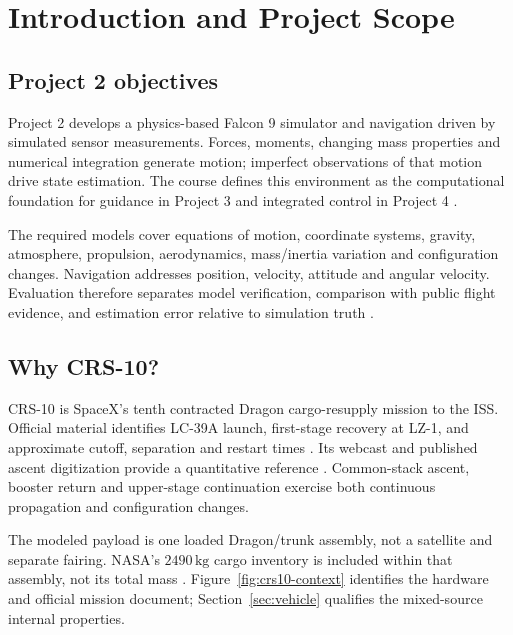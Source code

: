 \section{Introduction and Project Scope}
\label{sec:introduction}

\subsection{Project 2 objectives}
Project 2 develops a physics-based Falcon 9 simulator and navigation driven by simulated sensor measurements. Forces, moments, changing mass properties and numerical integration generate motion; imperfect observations of that motion drive state estimation. The course defines this environment as the computational foundation for guidance in Project 3 and integrated control in Project 4 \cite[slides 2--4]{project2}.

The required models cover equations of motion, coordinate systems, gravity, atmosphere, propulsion, aerodynamics, mass/inertia variation and configuration changes. Navigation addresses position, velocity, attitude and angular velocity. Evaluation therefore separates model verification, comparison with public flight evidence, and estimation error relative to simulation truth \cite[slides 4--6]{project2}.

\subsection{Why CRS-10?}
CRS-10 is SpaceX's tenth contracted Dragon cargo-resupply mission to the ISS. Official material identifies LC-39A launch, first-stage recovery at LZ-1, and approximate cutoff, separation and restart times \cite{nasacrs10press}. Its webcast and published ascent digitization provide a quantitative reference \cite{crs10webcast,crs10telemetry}. Common-stack ascent, booster return and upper-stage continuation exercise both continuous propagation and configuration changes.

The modeled payload is one loaded Dragon/trunk assembly, not a satellite and separate fairing. NASA's $2490\,\mathrm{kg}$ cargo inventory is included within that assembly, not its total mass \cite{nasacrs10overview}. Figure~\ref{fig:crs10-context} identifies the hardware and official mission document; Section~\ref{sec:vehicle} qualifies the mixed-source internal properties.

